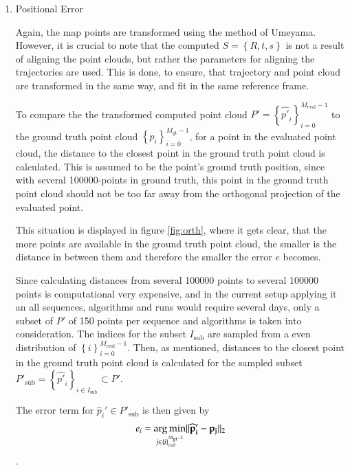 	\begin{enumerate}
	\item{Positional Error}\label{poseval}
	
	Again, the map points are transformed using the method of Umeyama. However, it is crucial to note that the computed 
	$S = \left\{R,t,s\right\}$ is not a result of aligning the point clouds, but rather the parameters for aligning the trajectories 
	are used. This is done, to ensure, that trajectory and point cloud are transformed in the same way, and fit in the same reference frame. 
	
	To compare the the transformed computed point cloud $P' = \left\{{\widehat{p'}_i}\right\}_{i=0}^{M_{\text{eval}}-1}$ to the ground truth point cloud
	$\left\{p_i\right\}_{i=0}^{M_{\text{gt}}-1}$, for a point in the evaluated point cloud, the distance to the closest point in the ground truth
	point cloud is calculated. This is assumed to be the point's ground truth position, since with several 100000-points in ground truth, this point in 
	the ground truth point cloud should not be too far away from the orthogonal projection of the evaluated point. 
	
	
	This situation is displayed in figure \ref{fig:orth}, where it gets clear, that the more points are available in the ground truth point cloud, 
	the smaller is the distance in between them and therefore the smaller the error $e$ becomes.

	Since calculating distances from several 100000 points to several 100000 points is computational very expensive, and in the current setup applying 
	it an all sequences, algorithms and runs would require several days, only a subset of $P'$ of 150 points per sequence and algorithms
	is taken into consideration. The indices for the subset $I_{\text{sub}}$ are sampled from a even distribution of $\left\{i\right\}_{i = 0}^{M_{\text{eval}}-1}$. 
	Then, as mentioned, distances to the closest point in the ground truth point cloud is calculated for the sampled subset 
	$P'_{\text{sub}} = \left\{{\widehat{p'}_i}\right\}_{i \in I_{\text{sub}}} \subset P'$. 
	
	The error term for $\widehat{p}_i' \in P'_{\text{sub}}$ is then given by
	$$ e_i = \mathop{\mathrm{arg\,min}}_{j \in \left\{i\right\}_{i=0}^{M_{\text{gt}}-1}} \lVert \mathbf{\widehat{p}_i' - p_j} \rVert_2 $$.
	

\end{enumerate}
